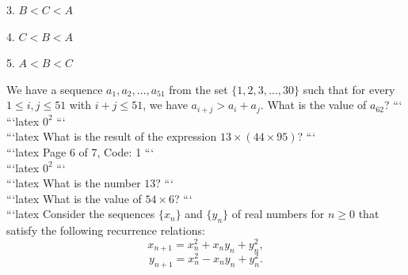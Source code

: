 3. $B < C < A$

4. $C < B < A$

5. $A < B < C$

We have a sequence $a_1, a_2, \ldots, a_{51}$ from the set $\{1, 2, 3, \ldots, 30\}$ such that for every $1 \leq i, j \leq 51$ with $i + j \leq 51$, we have $a_{i+j} > a_i + a_j$. What is the value of $a_{62}$?
```
\\
```latex
$0^2$
```
\\
```latex
What is the result of the expression $13 \times (44 \times 95)$?
```
\\
```latex
Page 6 of 7, Code: 1
```
\\
```latex
$0^2$
```
\\
```latex
What is the number $13$?
```
\\
```latex
What is the value of \( 54 \times 6 \)?
```
\\
```latex
Consider the sequences $\{x_n\}$ and $\{y_n\}$ of real numbers for $n \geq 0$ that satisfy the following recurrence relations:
$$ x_{n+1} = x_n^2 + x_n y_n + y_n^2, $$
$$ y_{n+1} = x_n^2 - x_n y_n + y_n^2. $$

